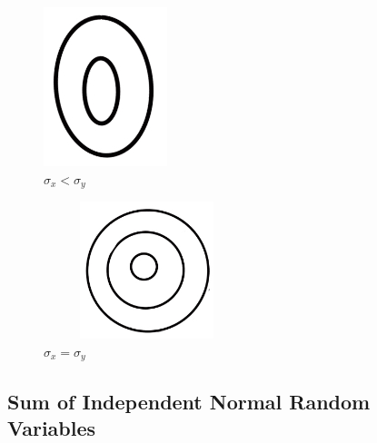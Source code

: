 \documentclass{article}
\begin{document}
\begin{figure}[h]
\begin{minipage}{.45\linewidth}
  \includegraphics[width=\linewidth]{images/L11/taller.jpeg}
  \caption{$\sigma_x < \sigma_y$}
  \label{taller}
\end{minipage}
\end{figure}

\begin{figure}[h]
\centering
\includegraphics[width=6cm, height=4cm]{images/L11/percent_circle.jpeg}
\caption{$\sigma_x = \sigma_y$}
\end{figure}

\subsection{Sum of Independent Normal Random Variables}
\end{document}
